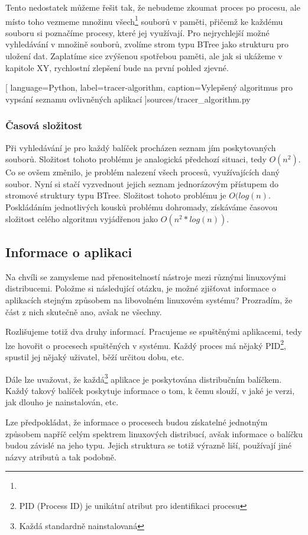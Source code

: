 \documentclass[10pt,a4paper]{article}
\begin{document}
		Tento nedostatek můžeme řešit tak, že nebudeme zkoumat proces po procesu, ale místo toho vezmeme množinu všech\footnote{} souborů v paměti, přičemž ke každému souboru si poznačíme procesy, které jej využívají. Pro nejrychlejší možné vyhledávání v množině souborů, zvolíme strom typu BTree jako strukturu pro uložení dat. Zaplatíme sice zvýšenou spotřebou paměti, ale jak si ukážeme v kapitole XY, rychlostní zlepšení bude na první pohled zjevné.

		
		[
			language={Python},
			label=tracer-algorithm,
			caption={Vylepšený algoritmus pro vypsání seznamu ovlivněných aplikací}
		]{sources/tracer_algorithm.py}

			\subsubsection*{Časová složitost}
			Při vyhledávání je pro každý balíček procházen seznam jím poskytovaných souborů. Složitost tohoto problému je analogická předchozí situaci, tedy $O(n^2)$. Co se ovšem změnilo, je problém nalezení všech procesů, využívajících daný soubor. Nyní si stačí vyzvednout jejich seznam jednorázovým přístupem do stromové struktury typu BTree. Složitost tohoto problému je $O(log(n)$. Poskládáním jednotlivých kousků problému dohromady, získáváme časovou složitost celého algoritmu vyjádřenou jako $O(n^2 * log(n))$.

		\subsection{Informace o aplikaci}
		Na chvíli se zamysleme nad přenositelností nástroje mezi různými linuxovými distribucemi. Položme si následující otázku, je možné zjišťovat informace o aplikacích stejným způsobem na libovolném linuxovém systému? Prozradím, že část z nich skutečně ano, avšak ne všechny.

		Rozlišujeme totiž dva druhy informací. Pracujeme se spuštěnými aplikacemi, tedy lze hovořit o procesech spuštěných v systému. Každý proces má nějaký PID\footnote{PID (Process ID) je unikátní atribut pro identifikaci procesu}, spustil jej nějaký uživatel, běží určitou dobu, etc.

		Dále lze uvažovat, že každá\footnote{Každá standardně nainstalovaná} aplikace je poskytována distribučním balíčkem. Každý takový balíček poskytuje informace o tom, k čemu slouží, v jaké je verzi, jak dlouho je nainstalován, etc.

		Lze předpokládat, že informace o procesech budou získatelné jednotným způsobem napříč celým spektrem linuxových distribucí, avšak informace o balíčku budou závislé na jeho typu. Jejich struktura se totiž výrazně liší, používají jiné názvy atributů a tak podobně.
\end{document}
